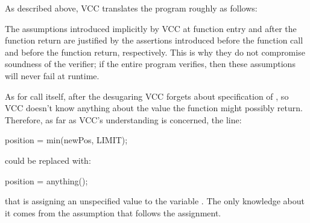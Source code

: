 As described above, VCC translates the program roughly as follows:

\begin{note}
The assumptions introduced implicitly by VCC at function entry and
after the function return are justified by the assertions
introduced before the function call and before the function return, respectively.
This is why they do not compromise soundness of the verifier;
\ie if the entire program verifies, then 
these assumptions will never fail at runtime.
\end{note}

As for call itself, after the desugaring VCC forgets about
specification of , so VCC doesn't know
anything about the value the function
might possibly return.  Therefore, as far as VCC's understanding is
concerned, the line:
\begin{VCC}
position = min(newPos, LIMIT);
\end{VCC}
\noindent
could be replaced with:
\begin{VCC}
position = anything();
\end{VCC}
\noindent
that is assigning an unspecified value to the variable .
The only knowledge about it comes from the assumption that follows the assignment.

